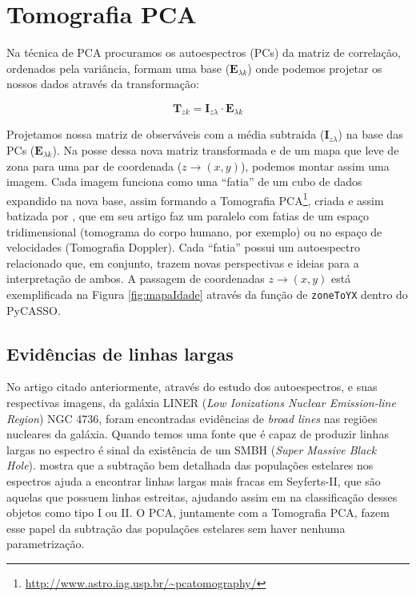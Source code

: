 
\section{Tomografia PCA}
\label{sec:PCAeTomoPCA:TomoPCA}

Na técnica de PCA procuramos os autoespectros (PCs) da matriz de correlação,
ordenados pela variância, formam uma base ($\mathbf{E}{}_{\lambda k}$) onde 
podemos projetar os nossos dados através da transformação:

\begin{equation}
	\label{eq:TomoPCA:tomogram2D}
	\mathbf{T}{}_{z k} = \mathbf{I}{}_{z \lambda} \cdot \mathbf{E}{}_{\lambda k}
\end{equation}

Projetamos nossa matriz de observáveis com a média subtraida ($\mathbf{I}{}_{z
\lambda}$) na base das PCs ($\mathbf{E}{}_{\lambda k}$). Na posse dessa nova
matriz transformada e de um mapa que leve de zona para uma par de coordenada ($z
\to (x, y)$), podemos montar assim uma imagem. Cada imagem funciona como uma
``fatia'' de um cubo de dados expandido na nova base, assim formando a
Tomografia PCA\footnote{\url{http://www.astro.iag.usp.br/~pcatomography/}},
criada e assim batizada por \citet{Steiner2009}, que em seu artigo faz um
paralelo com fatias de um espaço tridimensional (tomograma do corpo humano, por
exemplo) ou no espaço de velocidades (Tomografia Doppler). Cada ``fatia'' possui
um autoespectro relacionado que, em conjunto, trazem novas perspectivas e ideias
para a interpretação de ambos. A passagem de coordenadas $z \to (x, y)$ está
exemplificada na Figura \ref{fig:mapaIdade} através da função de
\texttt{zoneToYX} dentro do PyCASSO.

\subsection{Evidências de linhas largas}

No artigo citado anteriormente, através do estudo dos autoespectros, e suas
respectivas imagens, da galáxia LINER ({\em Low Ionizations Nuclear
Emission-line Region}) NGC 4736, foram encontradas evidências de {\em broad
lines} nas regiões nucleares da galáxia. Quando temos uma fonte que é capaz de
produzir linhas largas no espectro é sinal da existência de um SMBH ({\em Super
Massive Black Hole}). \citet{CidFernandes2004} mostra que a subtração bem
detalhada das populações estelares nos espectros ajuda a encontrar linhas largas
mais fracas em Seyferts-II, que são aquelas que possuem linhas estreitas,
ajudando assim em na classificação desses objetos como tipo I ou II. O PCA,
juntamente com a Tomografia PCA, fazem esse papel da subtração das populações
estelares sem haver nenhuma parametrização.

